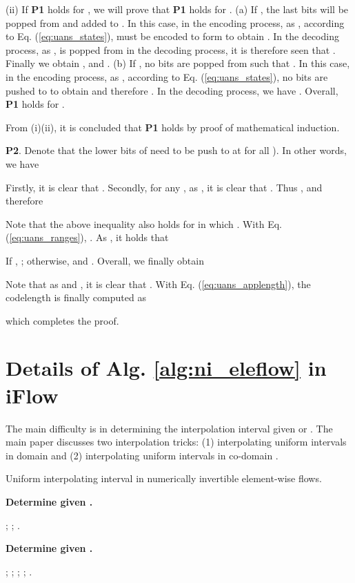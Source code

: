 \documentclass{article}
\begin{document}
(ii) If {\bf P1} holds for , we will prove that {\bf P1} holds for . (a) If , the last  bits will be popped from  and added to . In this case, in the encoding process, as , according to Eq. (\ref{eq:uans_states}),  must be encoded to form  to obtain . In the decoding process, as ,  is popped from  in the decoding process, it is therefore seen that . Finally we obtain , and . (b) If , no bits are popped from  such that . In this case, in the encoding process, as , according to Eq. (\ref{eq:uans_states}), no bits are pushed to  to obtain  and therefore . In the decoding process, we have . Overall, {\bf P1} holds for .

From (i)(ii), it is concluded that {\bf P1} holds by proof of mathematical induction.

{\bf P2}. Denote that the lower  bits of  need to be push to  at   for all ). In other words, we have


Firstly, it is clear that . Secondly, for any , as , it is clear that . Thus , and therefore


Note that the above inequality also holds for  in which . With Eq. (\ref{eq:uans_ranges}), . As , it holds that


If , ; otherwise,  and . Overall, we finally obtain



Note that as  and , it is clear that . With Eq. (\ref{eq:uans_applength}), the codelength is finally computed as 

which completes the proof.

\section{Details of Alg. \ref{alg:ni_eleflow} in iFlow}

The main difficulty is in determining the interpolation interval  given  or . The main paper discusses two interpolation tricks: (1) interpolating uniform intervals in domain  and (2) interpolating uniform intervals in co-domain .

\begin{algorithm}[ht]
\small
\caption{Uniform interpolating interval  in numerically invertible element-wise flows.}
\begin{multicols}{2} 
\textbf{Determine  given .} 

\begin{algorithmic}[1]
\STATE ;
\STATE ;
\RETURN .
\end{algorithmic}

\vspace{8pt}
\textbf{Determine  given .} 

\begin{algorithmic}[1]
\STATE ; 
\STATE ;
\STATE ;
\IF {}
\STATE ;
\ELSE
\STATE 
\ENDIF
\RETURN .
\end{algorithmic}
\end{multicols}
\vspace{-8pt}
\label{alg:ni_ele_x}
\end{algorithm}
\end{document}
